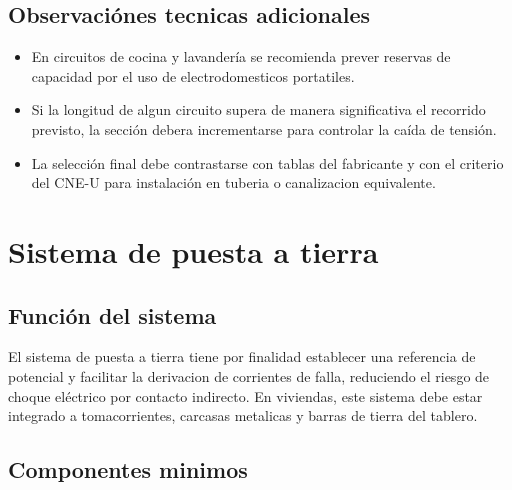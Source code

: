 \subsection{Observaciónes tecnicas adicionales}

\begin{itemize}
  \item En circuitos de cocina y lavandería se recomienda prever reservas de capacidad por el uso de electrodomesticos portatiles.
  \item Si la longitud de algun circuito supera de manera significativa el recorrido previsto, la sección debera incrementarse para controlar la caída de tensión.
  \item La selección final debe contrastarse con tablas del fabricante y con el criterio del CNE-U para instalación en tuberia o canalizacion equivalente.
\end{itemize}

\section{Sistema de puesta a tierra}

\subsection{Función del sistema}

El sistema de puesta a tierra tiene por finalidad establecer una referencia de potencial y facilitar la derivacion de corrientes de falla, reduciendo el riesgo de choque eléctrico por contacto indirecto. En viviendas, este sistema debe estar integrado a tomacorrientes, carcasas metalicas y barras de tierra del tablero.

\subsection{Componentes minimos}

